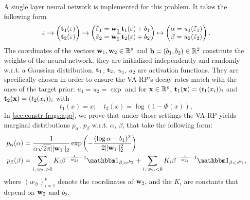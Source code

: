 A single layer neural network is implemented for this problem. It takes the following form
\begin{equation}\label{eq:neuralnet-architecture}
    \varepsilon \mapsto \begin{pmatrix}
        \mathbf{t}_1(\varepsilon)\\ \mathbf{t}_2(\varepsilon) 
    \end{pmatrix} \mapsto
    \begin{pmatrix}
        \tilde{\varepsilon}_1 = \mathbf{w}_1^\top\mathbf{t}_1(\varepsilon) + b_1 \\
        \tilde{\varepsilon}_2 = \mathbf{w}_2^\top\mathbf{t}_2(\varepsilon)+b_2 
    \end{pmatrix} \mapsto
    \begin{pmatrix}
        \alpha = u_1(\tilde{\varepsilon}_1)\\
        \beta = u_2(\tilde{\varepsilon}_2)
    \end{pmatrix}.
\end{equation}
The coordinates of the vectors $\mathbf{w}_1,\mathbf{w}_2\in\mathbb{R}^p$ and $\mathbf{b}=(b_1,b_2)\in\mathbb{R}^2$ constitute the weights of the neural network, they are initialized independently and randomly w.r.t. a Gaussian distribution. $\mathbf{t}_1$, $\mathbf{t}_2$, $u_1$, $u_2$ are activation functions.
They are specifically chosen in order to ensure the VA-RP's decay rates match with the ones of the target prior: $u_1=u_2=\exp$ and for $\mathbf{x}\in\mathbb{R}^p$, $\mathbf{t}_1(\mathbf{x})=(t_1(x_i))_i$ and $\mathbf{t}_2(\mathbf{x})=(t_2(x_i))_i$ with
\begin{equation}
    t_1(x) = x;\quad t_2(x) = \log(1-\Phi(x)),
\end{equation}
In \cref{sec:constr-frags:app}, we prove that under those settings the VA-RP yields marginal distributions $ p_\alpha$, $p_\beta$ w.r.t. $\alpha$, $\beta$, that take the following form:
    \begin{equation}
        \begin{aligned}
        p_\alpha(\alpha) &= \frac{1}{\alpha\sqrt{2\pi}\|\mbf w_1 \|_2}\exp\left(-\frac{(\log\alpha - b_1)^2}{2\|\mbf w_1\|^2_2}\right) \\
        p_\beta(\beta) &= \sum_{i,\, w_{2i}>0}{K_i}\beta^{-\frac{1}{w_{2i}}-1}\indic_{\beta>e^{b_2}} + \sum_{i,\, w_{2i}<0}K_i\beta^{-\frac{1}{w_{2i}}-1}\indic_{\beta<e^{b_2}},
    \end{aligned}
    \label{eq:marginaldist}
    \end{equation}
where $(w_{2i})_{i=1}^p$ denote the coordinates of $\mathbf{w}_2$, and the $K_i$ are constants that depend on $\mathbf{w}_2$ and $b_2$. 
